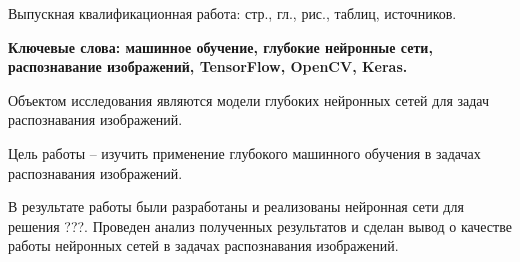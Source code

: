 
Выпускная квалификационная работа: \pageref{LastPage} стр., 
 гл., 
\totalfigures{} рис.,
\totaltables{} таблиц,
 источников.

\textbf{Ключевые слова: машинное обучение, глубокие нейронные сети, распознавание изображений, TensorFlow, OpenCV, Keras.}

Объектом исследования являются модели глубоких нейронных сетей для задач распознавания изображений. 

Цель работы – изучить применение глубокого машинного обучения в задачах распознавания изображений.

В результате работы были разработаны и реализованы нейронная сети для решения ???. Проведен анализ полученных результатов и сделан вывод о качестве работы нейронных сетей в задачах распознавания изображений.

\clearpage